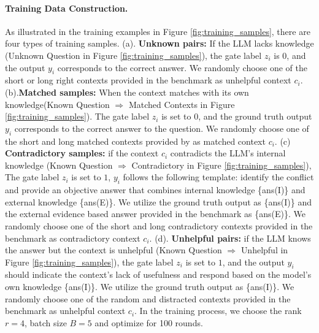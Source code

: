 \paragraph{Training Data Construction.} 
As illustrated in the training examples in Figure \ref{fig:training_samples}, there are four types of training samples. (a). \textbf{Unknown pairs:} If the LLM lacks knowledge  (Unknown Question in Figure \ref{fig:training_samples}), the gate label \( z_i \) is 0, and the output \( y_i \) corresponds to the correct answer. We randomly choose one of the short or long right contexts provided in the benchmark as unhelpful context $c_i$. (b).\textbf{Matched samples:}  When the context matches with its own knowledge(Known Question $\Rightarrow$ Matched Contexts in Figure \ref{fig:training_samples}). The gate label \( z_i \) is set to \( 0 \), and the ground truth output \( y_i \) corresponds to the correct answer to the question. We randomly choose one of the short and long matched contexts provided by \cite{xieadaptive} as matched context $c_i$. (c) \textbf{Contradictory samples:} if the context \( c_i \) contradicts the LLM's internal knowledge (Known Question $\Rightarrow$ {Contradictory} in Figure \ref{fig:training_samples}),  The gate label \( z_i \) is set to \( 1 \), $y_i$ follows the following template: identify the conflict  and provide an objective answer that combines  internal knowledge \colorbox{green!20}{\{ans(I)\}} and external knowledge \colorbox{blue!20}{\{ans(E)\}}. We utilize the ground truth output as {\{ans(I)\}} and the external evidence based answer provided in the  benchmark as {\{ans(E)\}}. We randomly choose one of the short and long contradictory contexts provided in the benchmark as contradictory context $c_i$. (d). \textbf{Unhelpful pairs: } if the LLM knows the answer  but the context  is unhelpful (Known Question $\Rightarrow$ {Unhelpful} in Figure \ref{fig:training_samples}), the gate label \( z_i \) is set to \( 1 \), and the output \( y_i \) should indicate the context's lack of usefulness and respond based on the model's own knowledge \colorbox{green!20}{\{ans(I)\}}.  We utilize the ground truth output as {\{ans(I)\}}. We randomly choose one of the random and distracted contexts provided in the benchmark as unhelpful context $c_i$. In the training process, we choose the rank $r=4$, batch size $B=5$ and optimize for 100 rounds. 



